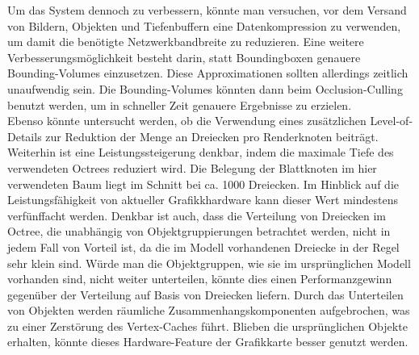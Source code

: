 Um das System dennoch zu verbessern, könnte man versuchen, vor dem Versand von Bildern, Objekten und Tiefenbuffern eine Datenkompression zu verwenden, um damit die benötigte Netzwerkbandbreite zu reduzieren. Eine weitere Verbesserungsmöglichkeit besteht darin, statt Boundingboxen genauere Bounding-Volumes einzusetzen. Diese Approximationen sollten allerdings zeitlich unaufwendig sein. Die Bounding-Volumes könnten dann beim Occlusion-Culling benutzt werden, um in schneller Zeit genauere Ergebnisse zu erzielen.\\
Ebenso könnte untersucht werden, ob die Verwendung eines zusätzlichen Level-of-Details zur Reduktion der Menge an Dreiecken pro Renderknoten beiträgt. Weiterhin ist eine Leistungssteigerung denkbar, indem die maximale Tiefe des verwendeten Octrees reduziert wird. Die Belegung der Blattknoten im hier verwendeten Baum liegt im Schnitt bei ca. 1000 Dreiecken. Im Hinblick auf die Leistungsfähigkeit von aktueller Grafikkhardware kann dieser Wert mindestens verfünffacht werden. Denkbar ist auch, dass die Verteilung von Dreiecken im Octree, die unabhängig von Objektgruppierungen betrachtet werden, nicht in jedem Fall von Vorteil ist, da die im Modell vorhandenen Dreiecke in der Regel sehr klein sind. Würde man die Objektgruppen, wie sie im ursprünglichen Modell vorhanden sind, nicht weiter unterteilen, könnte dies einen Performanzgewinn gegenüber der Verteilung auf Basis von Dreiecken liefern. Durch das Unterteilen von Objekten werden räumliche Zusammenhangskomponenten aufgebrochen, was zu einer Zerstörung des Vertex-Caches führt. Blieben die ursprünglichen Objekte erhalten, könnte dieses Hardware-Feature der Grafikkarte besser genutzt werden.

%
%
